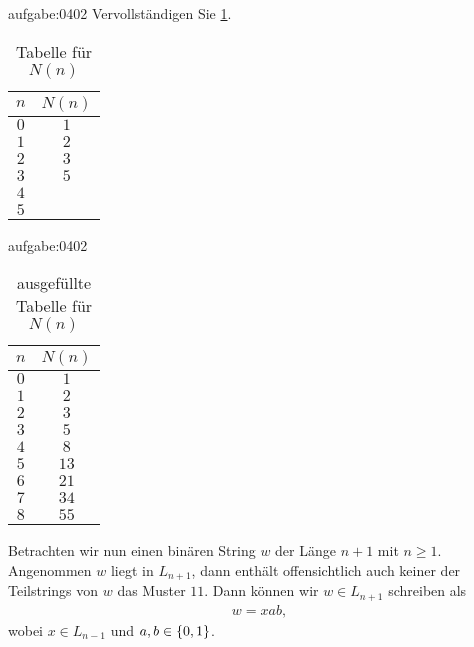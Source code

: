 \begin{aufgabe}{aufgabe:0402}
Vervollständigen Sie \cref{table:Nn}.
    \begin{table}[H]
        \begin{center}
        \begin{tabular}{c|c}
        $n$ & $N(n)$ \\ \hline
        $0$ & $1$ \\
        $1$ & $2$ \\ 
        $2$ & $3$ \\
        $3$ & $5$ \\
        $4$ & \\
        $5$ & \\ 
        \end{tabular}
        \end{center}
        \caption{Tabelle für $N(n)$}
        \label{table:Nn}
    \end{table}
\end{aufgabe}
\begin{antwort}{aufgabe:0402}
    \begin{table}[H]
        \begin{center}
        \begin{tabular}{c|c}
        $n$ & $N(n)$ \\ \hline
        $0$ & $1$ \\
        $1$ & $2$ \\ 
        $2$ & $3$ \\
        $3$ & $5$ \\
        $4$ & $8$ \\
        $5$ & $13$ \\ 
        $6$ & $21$ \\
        $7$ & $34$ \\
        $8$ & $55$ \\
        \end{tabular}
        \end{center}
        \caption{ausgefüllte Tabelle für $N(n)$}
        \label{table:Nncompleted}
    \end{table}
\end{antwort}
Betrachten wir nun einen binären String $w$ der Länge $n+1$ mit $n\geq 1$. Angenommen $w$ liegt in $L_{n+1}$, dann enthält offensichtlich auch keiner der Teilstrings von $w$ das Muster $11$. Dann können wir $w\in L_{n+1}$ schreiben als
\begin{align*}
    w = xab,
\end{align*}
wobei $x\in L_{n-1}$ und $a,b\in\left\{0,1\right\}$.

